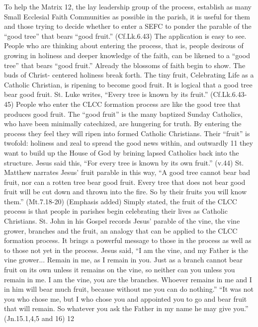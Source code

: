 \documentclass{article}
\begin{document}
To help the Matrix 12, the lay leadership group of the process, establish as
many Small Ecclesial Faith Communities as possible in the parish, it is useful
for them and those trying to decide whether to enter a SEFC to ponder the
parable of the ``good tree'' that bears ``good fruit.'' (Cf.Lk.6.43) The
application is easy to see. People who are thinking about entering the process,
that is, people desirous of growing in holiness and deeper knowledge of the
faith, can be likened to a ``good tree'' that bears ``good fruit.'' Already the
blossoms of faith begin to show. The buds of Christ- centered holiness break
forth. The tiny fruit, Celebrating Life as a Catholic Christian, is ripening to
become good fruit.
It is logical that a good tree bear good fruit. St. Luke writes, ``Every tree is
known by its fruit.'' (Cf.Lk.6.43-45) People who enter the CLCC formation
process are like the good tree that produces good fruit. The ``good fruit'' is
the many baptized Sunday Catholics, who have been minimally catechized, are
hungering for truth. By entering the process they feel they will ripen into
formed Catholic Christians. Their ``fruit'' is twofold: holiness and zeal to
spread the good news within, and outwardly
11
they want to build up the House of God by brining lapsed Catholics back into the
structure. Jesus said this, ``For every tree is known by its own fruit.'' (v.44)
St. Matthew narrates Jesus' fruit parable in this way, ``A good tree cannot bear
bad fruit, nor can a rotten tree bear good fruit. Every tree that does not bear
good fruit will be cut down and thrown into the fire. So by their fruits you
will know them.'' (Mt.7.18-20) (Emphasis added) Simply stated, the fruit of the
CLCC process is that people in parishes begin celebrating their lives as
Catholic Christians.
St. John in his Gospel records Jesus' parable of the vine, the vine grower,
branches and the fruit, an analogy that can be applied to the CLCC formation
process. It brings a powerful message to those in the process as well as to
those not yet in the process.
Jesus said, ``I am the vine, and my Father is the vine grower... Remain in me,
as I remain in you. Just as a branch cannot bear fruit on its own unless it
remains on the vine, so neither can you unless you remain in me. I am the vine,
you are the branches. Whoever remains in me and I in him will bear much fruit,
because without me you can do nothing.''
``It was not you who chose me, but I who chose you and appointed you to go and
bear fruit that will remain. So whatever you ask the Father in my name he may
give you.'' (Jn.15.1,4,5 and 16)
12
\end{document}
